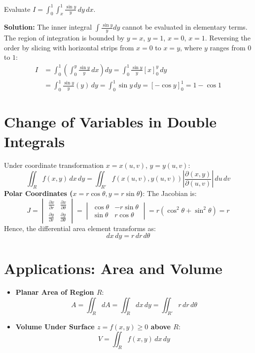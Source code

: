 \begin{example}
Evaluate $I = \int_0^1 \int_x^1 \frac{\sin y}{y} \, dy \, dx$.

\textbf{Solution:}
The inner integral $\int \frac{\sin y}{y} dy$ cannot be evaluated in elementary terms.
The region of integration is bounded by $y = x$, $y = 1$, $x = 0$, $x = 1$.
Reversing the order by slicing with horizontal strips from $x = 0$ to $x = y$, where $y$ ranges from $0$ to $1$:
\begin{align*}
I &= \int_0^1 \left( \int_0^y \frac{\sin y}{y} \, dx \right) dy = \int_0^1 \frac{\sin y}{y} [x]_0^y \, dy \\
  &= \int_0^1 \frac{\sin y}{y} (y) \, dy = \int_0^1 \sin y \, dy = [-\cos y]_0^1 = 1 - \cos 1
\end{align*}
\end{example}

\section{Change of Variables in Double Integrals}
Under coordinate transformation $x = x(u,v)$, $y = y(u,v)$:
\begin{equation}
\iint_R f(x,y) \, dx \, dy = \iint_{R'} f(x(u,v), y(u,v)) \left| \frac{\partial(x,y)}{\partial(u,v)} \right| \, du \, dv
\end{equation}
\textbf{Polar Coordinates ($x = r\cos\theta, y = r\sin\theta$)}:
The Jacobian is:
\begin{equation}
J = \begin{vmatrix} \frac{\partial x}{\partial r} & \frac{\partial x}{\partial \theta} \\ \frac{\partial y}{\partial r} & \frac{\partial y}{\partial \theta} \end{vmatrix} = \begin{vmatrix} \cos\theta & -r\sin\theta \\ \sin\theta & r\cos\theta \end{vmatrix} = r(\cos^2\theta + \sin^2\theta) = r
\end{equation}
Hence, the differential area element transforms as:
\begin{equation}
dx \, dy = r \, dr \, d\theta
\end{equation}

\section{Applications: Area and Volume}
\begin{itemize}
    \item \textbf{Planar Area of Region $R$}:
    \begin{equation}
    A = \iint_R dA = \iint_R dx \, dy = \iint_{R'} r \, dr \, d\theta
    \end{equation}
    \item \textbf{Volume Under Surface $z = f(x,y) \ge 0$ above $R$}:
    \begin{equation}
    V = \iint_R f(x,y) \, dx \, dy
    \end{equation}
\end{itemize}

